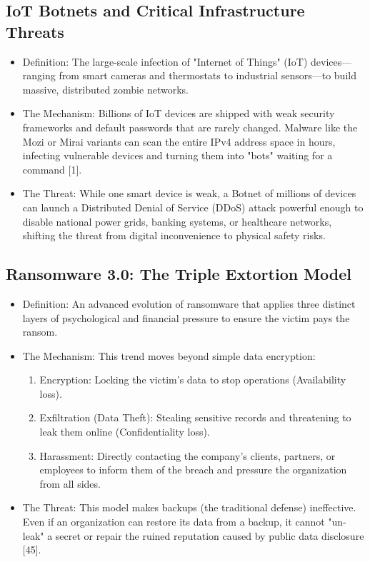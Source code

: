 \subsection{IoT Botnets and Critical Infrastructure Threats}

\begin{itemize}
  \item Definition: The large-scale infection of "Internet of Things" (IoT) devices---ranging from smart cameras and thermostats to industrial sensors---to build massive, distributed zombie networks.
  \item The Mechanism: Billions of IoT devices are shipped with weak security frameworks and default passwords that are rarely changed. Malware like the Mozi or Mirai variants can scan the entire IPv4 address space in hours, infecting vulnerable devices and turning them into "bots" waiting for a command [1].
  \item The Threat: While one smart device is weak, a Botnet of millions of devices can launch a Distributed Denial of Service (DDoS) attack powerful enough to disable national power grids, banking systems, or healthcare networks, shifting the threat from digital inconvenience to physical safety risks.
\end{itemize}

\subsection{Ransomware 3.0: The Triple Extortion Model}

\begin{itemize}
  \item Definition: An advanced evolution of ransomware that applies three distinct layers of psychological and financial pressure to ensure the victim pays the ransom.
  \item The Mechanism: This trend moves beyond simple data encryption:
  \begin{enumerate}
    \item Encryption: Locking the victim's data to stop operations (Availability loss).
    \item Exfiltration (Data Theft): Stealing sensitive records and threatening to leak them online (Confidentiality loss).
    \item Harassment: Directly contacting the company's clients, partners, or employees to inform them of the breach and pressure the organization from all sides.
  \end{enumerate}
  \item The Threat: This model makes backups (the traditional defense) ineffective. Even if an organization can restore its data from a backup, it cannot "un-leak" a secret or repair the ruined reputation caused by public data disclosure [45].
\end{itemize}

